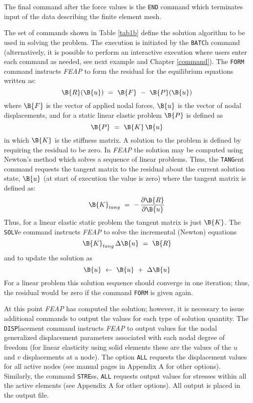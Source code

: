 The final command after the force values is the {\tt END} command which
terminates input of the data describing the finite element mesh.

The set of commands shown in Table \ref{tab1b}
define the solution algorithm to be used in solving the
problem.  The execution is initiated by the {\tt BATC}h command
(alternatively, it
is possible to perform an interactive execution where users enter each
command as needed, see next example and
Chapter \ref{command}).  The {\tt FORM} command instructs {\sl FEAP}
to form the residual for the equilibrium equations written as:
$$\B{R} ( \B{u} ) ~=~ \B{F} ~-~ \B{P}( \B{u} )$$
where $\B{F}$ is the vector of applied nodal forces,
$\B{u}$ is the vector of nodal displacements, and
for a static linear elastic problem $\B{P}$ is defined as
\begin{equation}
\B{P} ~=~ \B{K} \, \B{u}
\end{equation}
in which $\B{K}$ is the stiffness matrix.
A solution to the problem is defined by requiring the residual to be zero.
In {\sl FEAP} the solution may be computed using Newton's method which solves
a sequence of linear problems.
Thus, the {\tt TANG}ent command
requests the tangent matrix to the residual about the current solution state,
$\B{u}$ (at start of execution
the value is zero)
where the tangent matrix is defined as:
\begin{equation}
\B{K}_{tang} ~=~ - \, \frac{\partial \B{R}}{\partial \B{u}}
\end{equation}
Thus, for a linear elastic
static problem the tangent matrix is just $\B{K}$.
The {\tt SOLV}e command instructs {\sl FEAP} to solve
the incremental (Newton) equations
\begin{equation}
\B{K}_{tang} \, \Delta \B{u} ~=~ \B{R}
\end{equation}
and to update the solution as
\begin{equation}
\B{u} ~ \leftarrow ~ \B{u} ~+~ \Delta \B{u}
\end{equation}
For a linear problem this solution sequence should converge in one iteration;
thus, the residual would be zero if the command {\tt FORM} is given again.

At this point {\sl FEAP} has computed the solution; however, it is necessary
to issue additional commands to output the values for each type of solution
quantity.
The {\tt DISP}\-lace\-ment command instructs {\sl FEAP} to output values for
the nodal generalized displacement parameters associated with each nodal
degree of freedom (for linear elasticity using solid elements these are
the values of the $u$ and $v$ displacements at a node).
The option {\tt ALL} requests the displacement
values for all active nodes (see manual
pages in Appendix A for other options).  Similarly, the command
{\tt STRE}ss, {\tt ALL} requests output values for
stresses within all the active elements (see Appendix A for other options).
All output is placed in the output file.


